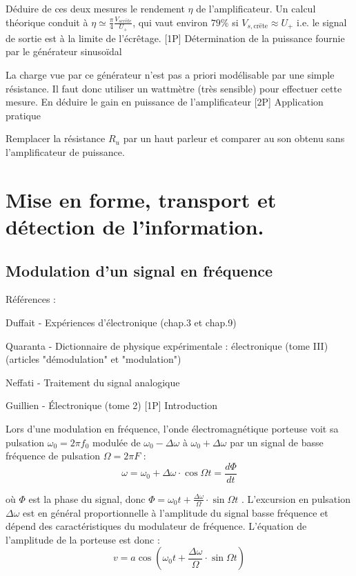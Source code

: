 \documentclass{article}%
\begin{document}
Déduire de ces deux mesures le rendement $\eta$ de l'amplificateur. Un calcul théorique conduit à $\eta \simeq \frac{\pi}{4} \frac{V_{s{cr\hat{e}te}}}{U_+}$, qui vaut environ $79\%$ si $V_{s,\mathrm{cr\hat{e}te}} \approx U_+$ i.e. le signal de sortie est à la limite de l'écrêtage.
[1P] Détermination de la puissance fournie par le générateur sinusoïdal

La charge vue par ce générateur n'est pas a priori modélisable par une simple résistance. Il faut donc utiliser un wattmètre (très sensible) pour effectuer cette mesure. En déduire le gain en puissance de l'amplificateur
[2P] Application pratique

Remplacer la résistance $R_u$ par un haut parleur et comparer au son obtenu sans l'amplificateur de puissance. 

\section{Mise en forme, transport et détection de l'information.}
\subsection{Modulation d'un signal en fréquence}

Références :

Duffait - Expériences d'électronique (chap.3 et chap.9)

Quaranta - Dictionnaire de physique expérimentale : électronique (tome III) (articles "démodulation" et "modulation")

Neffati - Traitement du signal analogique

Guillien - Électronique (tome 2)
[1P] Introduction

Lors d'une modulation en fréquence, l'onde électromagnétique porteuse voit sa pulsation $\omega_0=2\pi f_0$ modulée de $\omega _{0} - \Delta \omega$ à $\omega_{0}+\Delta \omega$ par un signal de basse fréquence de pulsation $\Omega =2\pi F$ :
\[ \omega = \omega _{0} + \Delta \omega \cdot \cos \Omega t = \frac{d\Phi }{dt}\]

où $\Phi$ est la phase du signal, donc $\Phi = \omega _{0}t + \frac{\Delta \omega }{\Omega } \cdot \sin\Omega t$ . L'excursion en pulsation $\Delta \omega$ est en général proportionnelle à l'amplitude du signal basse fréquence et dépend des caractéristiques du modulateur de fréquence. L'équation de l'amplitude de la porteuse est donc :
\[ v = a \cos\left(\omega _{0}t +\frac{\Delta \omega }{\Omega }\cdot \sin\Omega t\right)\]
\end{document}
